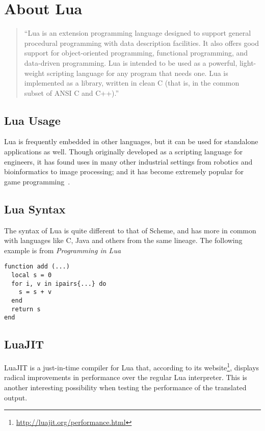 \section{About Lua}

\begin{quotation}
``Lua is an extension programming language designed to support general
procedural programming with data description facilities. It also offers good
support for object-oriented programming, functional programming, and data-driven
programming. Lua is intended to be used as a powerful, light-weight scripting
language for any program that needs one. Lua is implemented as a library,
written in clean C (that is, in the common subset of ANSI C and
C++).''~\cite[Sec~1]{luamanual}
\end{quotation}
\subsection{Lua Usage}

Lua is frequently embedded in other languages, but it can be used for
stand\-alone applications as well. Though originally developed as a scripting
language for engineers, it has found uses in many other industrial settings from
robotics and bioinformatics to image processing; and it has become extremely
popular for game programming~\cite{evolua}.

\subsection{Lua Syntax}

The syntax of Lua is quite different to that of Scheme, and has more in common
with languages like C, Java and others from the same lineage. The following example is from \emph{Programming in Lua}~\cite[p.40]{luabook}
\begin{framed}
\begin{verbatim}
function add (...)
  local s = 0
  for i, v in ipairs{...} do
    s = s + v
  end
  return s
end
\end{verbatim}
\end{framed}

\subsection{LuaJIT}

LuaJIT\cite{luajit} is a just-in-time compiler for Lua that, according to its
website\footnote{\url{http://luajit.org/performance.html}}, displays radical
improvements in performance over the regular Lua interpreter. This is another
interesting possibility when testing the performance of the translated output.


